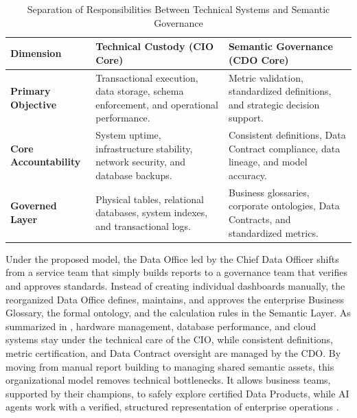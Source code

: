 \begin{table}[t]
\centering
\small
\caption{Separation of Responsibilities Between Technical Systems and Semantic Governance}
\label{tab:governance_responsibilities}
\begin{tabular}{p{3.2cm} p{5.5cm} p{5.5cm}}
\hline
\textbf{Dimension} & \textbf{Technical Custody (CIO Core)} & \textbf{Semantic Governance (CDO Core)} \\ \hline
\textbf{Primary Objective} & Transactional execution, data storage, schema enforcement, and operational performance. & Metric validation, standardized definitions, and strategic decision support. \\ 
\textbf{Core Accountability} & System uptime, infrastructure stability, network security, and database backups. & Consistent definitions, Data Contract compliance, data lineage, and model accuracy. \\ 
\textbf{Governed Layer} & Physical tables, relational databases, system indexes, and transactional logs. & Business glossaries, corporate ontologies, Data Contracts, and standardized metrics. \\ \hline
\end{tabular}
\end{table}

Under the proposed model, the Data Office led by the Chief Data Officer shifts from a service team that simply builds reports to a governance team that verifies and approves standards. 
Instead of creating individual dashboards manually, the reorganized Data Office defines, maintains, and approves the enterprise Business Glossary, the formal ontology, 
and the calculation rules in the Semantic Layer. 
As summarized in , hardware management, database performance, and cloud systems stay under the technical care of the CIO, 
while consistent definitions, metric certification, and Data Contract oversight are managed by the CDO. 
By moving from manual report building to managing shared semantic assets, this organizational model removes technical bottlenecks. 
It allows business teams, supported by their champions, to safely explore certified Data Products, while AI agents work with a verified, structured representation of 
enterprise operations \cite{davenport2017competing, dehghani2022data}.